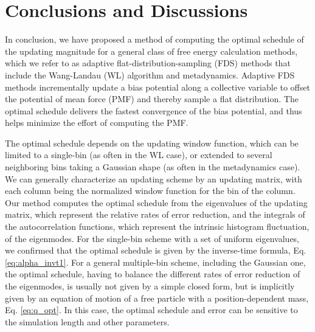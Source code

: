 \documentclass[preprint, superscriptaddress, floatfix]{revtex4-1}
\begin{document}
\section{\label{sec:conclusion}
Conclusions and Discussions}



In conclusion,
we have proposed a method of computing
the optimal schedule of the updating magnitude
for a general class of free energy calculation methods,
which we refer to as adaptive flat-distribution-sampling (FDS) methods
that include the Wang-Landau (WL) algorithm and metadynamics.
%
Adaptive FDS methods
incrementally update a bias potential
along a collective variable
to offset the potential of mean force (PMF)
and thereby sample a flat distribution.
%
The optimal schedule delivers the fastest convergence
of the bias potential,
and thus helps minimize the effort
of computing the PMF.


The optimal schedule depends on the updating window function,
which can be limited to a single-bin (as often in the WL case),
or extended to several neighboring bins
taking a Gaussian shape (as often in the metadynamics case).
%
We can generally characterize
an updating scheme by an updating matrix,
with each column being the normalized
window function for the bin of the column.
%
Our method computes the optimal schedule from
the eigenvalues of the updating matrix,
which represent the relative rates of error reduction,
and the integrals of the autocorrelation functions,
which represent the intrinsic histogram fluctuation,
of the eigenmodes.
%
For the single-bin scheme with a set of uniform eigenvalues,
we confirmed that the optimal schedule
is given by the inverse-time formula,
Eq. \eqref{eq:alpha_invt1}.
%
For a general multiple-bin scheme,
including the Gaussian one,
the optimal schedule, having to balance
the different rates of error reduction of the eigenmodes,
is usually not given by a simple closed form,
but is implicitly given by an equation of motion
of a free particle with a position-dependent mass,
Eq. \eqref{eq:q_opt}.
%
In this case,
the optimal schedule and error
can be sensitive to the simulation length
and other parameters.
\end{document}
